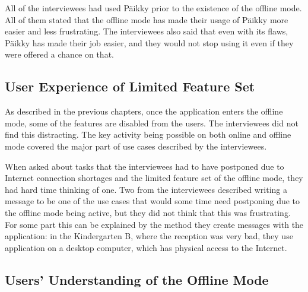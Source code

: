 All of the interviewees had used Päikky prior to the existence of the offline mode. All of them stated that the offline mode has made their usage of Päikky more easier and less frustrating. The interviewees also said that even with its flaws, Päikky has made their job easier, and they would not stop using it even if they were offered a chance on that.






\subsection{User Experience of Limited Feature Set}

As described in the previous chapters, once the application enters the offline mode, some of the features are disabled from the users. The interviewees did not find this distracting. The key activity being possible on both online and offline mode covered the major part of use cases described by the interviewees.

When asked about tasks that the interviewees had to have postponed due to Internet connection shortages and the limited feature set of the offline mode, they had hard time thinking of one. Two from the interviewees described writing a message to be one of the use cases that would some time need postponing due to the offline mode being active, but they did not think that this was frustrating. For some part this can be explained by the method they create messages with the application: in the Kindergarten B, where the reception was very bad, they use application on a desktop computer, which has physical access to the Internet.





\subsection{Users' Understanding of the Offline Mode}
\label{subsec:offline-understanding}

